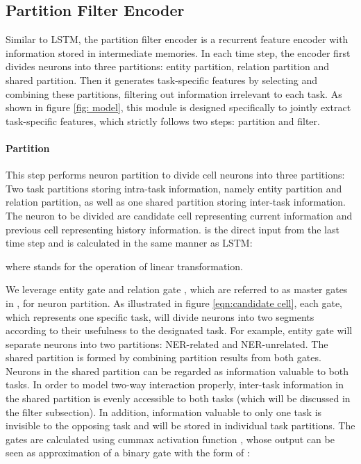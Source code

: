 \documentclass[11pt]{article}
\begin{document}
\subsection{Partition Filter Encoder} 
Similar to LSTM, the partition filter encoder is a recurrent feature encoder with information stored in intermediate memories. In each time step, the encoder first divides neurons into three partitions: entity partition, relation partition and shared partition. Then it generates task-specific features by selecting and combining these partitions, filtering out information irrelevant to each task. As shown in figure \ref{fig: model}, this module is designed specifically to jointly extract task-specific features, which strictly follows two steps: partition and filter. 

\paragraph{Partition} 
This step performs neuron partition to divide cell neurons into three partitions: Two task partitions storing intra-task information, namely entity partition and relation partition, as well as one shared partition storing inter-task information. The neuron to be divided are candidate cell  representing current information and previous cell  representing history information.  is the direct input from the last time step and  is calculated in the same manner as LSTM:


where  stands for the operation of linear transformation. 

We leverage entity gate  and relation gate , which are referred to as master gates in  \citep{shen2018ordered}, for neuron partition. As illustrated in figure \ref{eqn:candidate cell}, each gate, which represents one specific task, will divide neurons into two segments according to their usefulness to the designated task. For example, entity gate  will separate neurons into two partitions: NER-related and NER-unrelated. The shared partition is formed by combining partition results from both gates. Neurons in the shared partition can be regarded as information valuable to both tasks. In order to model two-way interaction properly, inter-task information in the shared partition is evenly accessible to both tasks (which will be discussed in the filter subsection). In addition, information valuable to only one task is invisible to the opposing task and will be stored in individual task partitions.
The gates are calculated using cummax activation function \footnotemark, whose output can be seen as approximation of a binary gate with the form of : 
\end{document}
